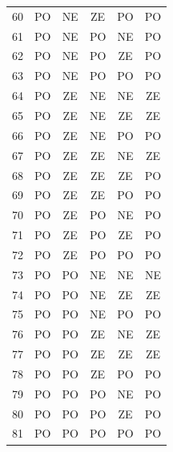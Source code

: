 \begin{table}[ht]
\begin{minipage}{0.48\textwidth}
\begin{tabular}{cccccc}
			60 & PO & NE & ZE & PO & PO \\
			61 & PO & NE & PO & NE & PO \\
			62 & PO & NE & PO & ZE & PO \\
			63 & PO & NE & PO & PO & PO \\
			64 & PO & ZE & NE & NE & ZE \\
			65 & PO & ZE & NE & ZE & ZE \\
			66 & PO & ZE & NE & PO & PO \\
			67 & PO & ZE & ZE & NE & ZE \\
			68 & PO & ZE & ZE & ZE & PO \\
			69 & PO & ZE & ZE & PO & PO \\
			70 & PO & ZE & PO & NE & PO \\
			71 & PO & ZE & PO & ZE & PO \\
			72 & PO & ZE & PO & PO & PO \\
			73 & PO & PO & NE & NE & NE \\
			74 & PO & PO & NE & ZE & ZE \\
			75 & PO & PO & NE & PO & PO \\
			76 & PO & PO & ZE & NE & ZE \\
			77 & PO & PO & ZE & ZE & ZE \\
			78 & PO & PO & ZE & PO & PO \\
			79 & PO & PO & PO & NE & PO \\
			80 & PO & PO & PO & ZE & PO \\
			81 & PO & PO & PO & PO & PO \\
			\bottomrule
		\end{tabular}
	\end{minipage}
	
\end{table}

